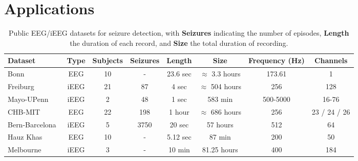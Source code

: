 \section{Applications}
\label{sec:app}



\begin{table*}[t]
\centering
\renewcommand{\arraystretch}{1.2}
\caption{Public EEG/iEEG datasets for seizure detection, with \textbf{Seizures} indicating the number of episodes, \textbf{Length} the duration of each record, and \textbf{Size} the total duration of recording.}
\label{tab:ep}
\footnotesize
\begin{tabular}{lccccccc}
\hline
\textbf{Dataset} & \textbf{Type} &  \textbf{Subjects} &  \textbf{Seizures} & \textbf{Length} & \textbf{Size} &  \textbf{Frequency (Hz)} &  \textbf{Channels} \\ \hline
Bonn~\cite{andrzejak2001indications}             & EEG & {10}                                 & {-}       & {23.6 sec}          & {$\approx$ 3.3 hours}                           & {173.61}                   & {1}               \\
Freiburg~\cite{ihle2012epilepsiae}         & iEEG & {21}            & {87}         & {4 sec}         & {$\approx$ 504 hours }         & {256}                      & {128}               \\
Mayo-UPenn~\cite{seizure-detection}       & iEEG & {2}                                  & {48}                    & {1 sec}           & {583 min}                         & {500-5000}                 & {16-76}             \\
CHB-MIT~\cite{guttag2010chb,shoeb2009application,goldberger2000physiobank}          & EEG & {22}                                 & {198}          & {1 hour}                    & {$\approx$ 686 hours}                    & {256}                      & {23 / 24 / 26}         \\
Bern-Barcelona~\cite{andrzejak2012nonrandomness}   & iEEG & {5}                                  & {3750}              & {20 sec}               & {57 hours}                        & {512}                      & {64}                \\
Hauz Khas~\cite{hauz}        & EEG & {10}                                 & {-}       & {5.12 sec}          & {87 min}                           & {200}                      & {50}                \\
Melbourne~\cite{melbourne}        & iEEG & {3}                                  & {-}      & {10 min}             & {81.25 hours}                            & {400}                      & {184}               \\

\end{tabular}
\end{table*}
